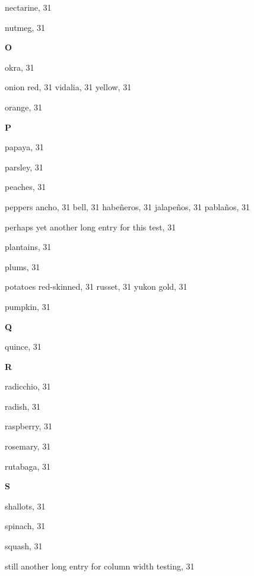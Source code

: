 \begin{theindex}
  \item nectarine, 31
  \item nutmeg, 31

  \indexspace
{\sffamily\bfseries{O}}\nopagebreak

  \item okra, 31\pagebreak %
  \item onion
    \subitem red, 31
    \subitem vidalia, 31
    \subitem yellow, 31
  \item orange, 31

  \indexspace
{\sffamily\bfseries{P}}\nopagebreak

  \item papaya, 31
  \item parsley, 31
  \item peaches, 31
  \item peppers
    \subitem ancho, 31
    \subitem bell, 31
    \subitem habe\~{n}eros, 31
    \subitem jalape\~{n}os, 31
    \subitem pabla\~{n}os, 31
  \item perhaps yet another long entry for this test, 31
  \item plantains, 31
  \item plums, 31
  \item potatoes
    \subitem red-skinned, 31
    \subitem russet, 31
    \subitem yukon gold, 31
  \item pumpkin, 31

  \indexspace
{\sffamily\bfseries{Q}}\nopagebreak

  \item quince, 31

  \indexspace
{\sffamily\bfseries{R}}\nopagebreak

  \item radicchio, 31
  \item radish, 31
  \item raspberry, 31
  \item rosemary, 31
  \item rutabaga, 31\newpage %

  \indexspace
{\sffamily\bfseries{S}}\nopagebreak

  \item shallots, 31
  \item spinach, 31
  \item squash, 31
  \item still another long entry for column width testing, 31


\end{theindex}
